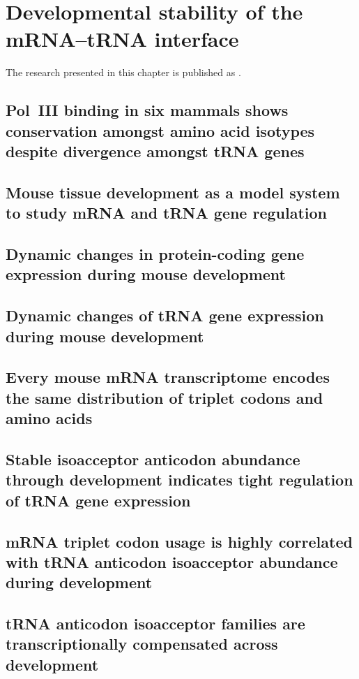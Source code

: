 \chapter{Developmental stability of the mRNA–tRNA interface}

The research presented in this chapter is published as \citet{Schmitt:2014}.


\section{Pol~III binding in six mammals shows conservation amongst amino acid
isotypes despite divergence amongst tRNA genes}


\section{Mouse tissue development as a model system to study mRNA and tRNA gene
regulation}

\section{Dynamic changes in protein-coding gene expression during mouse
development}

\section{Dynamic changes of tRNA gene expression during mouse development}

\section{Every mouse mRNA transcriptome encodes the same distribution of
triplet codons and amino acids}

\section{Stable isoacceptor anticodon abundance through development indicates
tight regulation of tRNA gene expression}

\section{mRNA triplet codon usage is highly correlated with tRNA anticodon
isoacceptor abundance during development}

\section{tRNA anticodon isoacceptor families are transcriptionally compensated
across development}
